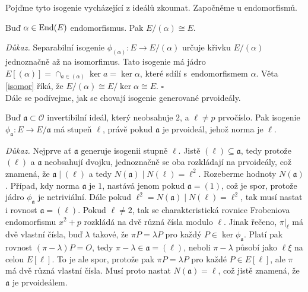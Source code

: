 \documentclass[12pt]{report}
\begin{document}
Pojďme tyto isogenie vycházející z ideálů zkoumat. Započněme u endomorfismů.
\begin{lemma}\label{endo}
Buď $\alpha \in \operatorname{End}(E)$ endomorfismus. Pak $E/(\alpha) \cong E$.
\end{lemma}
\noindent \textit{Důkaz.} Separabilní isogenie $\phi_{(\alpha)} : E \longrightarrow E/(\alpha)$ určuje křivku $E/(\alpha)$ jednoznačně až na isomorfimus. Tato isogenie má jádro $E[(\alpha)] = \cap_{a \in (\alpha)} \ker a = \ker \alpha$, které sdílí s~endomorfismem $\alpha$. Věta \ref{isomor} říká, že $E/(\alpha) \cong E/\ker \alpha \cong E$. \hfill $\square$\\


Dále se podívejme, jak se chovají isogenie generované prvoideály. 

\begin{veta}\label{normm}
Buď $\mathfrak{a} \subset \mathcal{O}$ invertibilní ideál, který neobsahuje $2$, a $\ell \neq p$ prvočíslo. Pak isogenie $\phi_{\mathfrak{a}} : E \longrightarrow E/\mathfrak{a}$ má stupeň $\ell$, právě pokud $\mathfrak{a}$ je prvoideál, jehož norma je $\ell$.
\end{veta}
\noindent \textit{Důkaz.} Nejprve ať $\mathfrak{a}$ generuje isogenii stupně $\ell$. Jistě $(\ell) \subseteq \mathfrak{a}$, tedy protože $(\ell)$ a $\mathfrak{a}$ neobsahují dvojku, jednoznačně se oba rozkládají na prvoideály, což znamená, že $\mathfrak{a} \mid (\ell)$ a tedy $N(\mathfrak{a}) \mid N(\ell) = \ell ^2$. Rozeberme hodnoty $N(\mathfrak{a})$. Případ, kdy norma $\mathfrak{a}$ je $1$, nastává jenom pokud $\mathfrak{a} = (1)$, což je spor, protože jádro $\phi_{\mathfrak{a}}$ je netriviální. Dále pokud $ \ell^2 = N(\mathfrak{a})  \mid N(\ell) = \ell ^2$, tak musí nastat i rovnost $\mathfrak{a} = (\ell)$. Pokud $\ell \neq 2$, tak se charakteristická rovnice Frobeniova endomorfismu $x^2 + p$ rozkládá na dvě různá čísla modulo $\ell$. Jinak řečeno, $\pi \vert_{\ell}$ má dvě vlastní čísla, buď $\lambda$ takové, že $\pi P = \lambda P$ pro každý $P \in \ker \phi_{\mathfrak{a}}$. Platí pak rovnost $(\pi - \lambda) P = O$, tedy $\pi - \lambda \in \mathfrak{a} = (\ell)$, neboli $\pi - \lambda$ působí jako $\ell \xi$ na celou $E[\ell]$. To je ale spor, protože pak $\pi P = \lambda P$ pro každé $P \in E[\ell]$, ale $\pi$ má dvě různá vlastní čísla. Musí proto nastat $N(\mathfrak{a}) = \ell$, což jistě znamená, že $\mathfrak{a}$ je prvoideálem.
\end{document}

